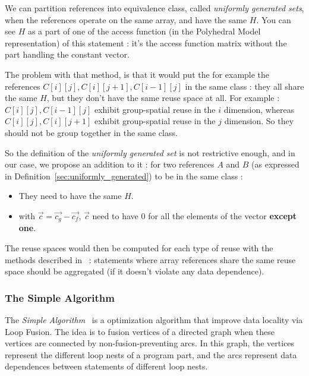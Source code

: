 \documentclass[paper=a4, fontsize=11pt]{scrartcl}
\numberwithin{equation}{section}        %
\numberwithin{figure}{section}          %
\numberwithin{table}{section}               %
\begin{document}
            We can partition references into equivalence class, called \textit{uniformly generated sets},
            when the references operate on the same array, and have the same $H$.
            You can see $H$ as a part of one of the access function (in the Polyhedral Model representation) of this statement :
            it's the access function matrix without the part handling the constant vector.

            The problem with that method, is that it would put the for example the references
            $C[i][j],C[i][j+1],C[i-1][j]$ in the same class : they all share the
            same $H$, but they don't have the same reuse space at all.
            For example : $C[i][j],C[i-1][j]$ exhibit group-spatial reuse in the $i$ dimension,
            whereas $C[i][j],C[i][j+1]$ exhibit group-spatial reuse in the $j$ dimension. So they
            should not be group together in the same class.
            \medskip

            So the definition of the \textit{uniformly generated set} is not restrictive enough,
            and in our case, we propose an addition to it : for two references $A$ and
            $B$ (as expressed in Definition~\ref{sec:uniformly_generated}) to be in the same class :
            \begin{itemize}
                \item They need to have the same $H$.
                \item with $\vec{c}=\vec{c_g} - \vec{c_f}$, $\vec{c}$ need to have $0$
                    for all the elements of the vector \textbf{except one}.
            \end{itemize}

            The reuse spaces would then be computed for each type of reuse
            with the methods described in~\cite{Wolf'91} : statements where
            array references share the same reuse space should be aggregated (if
            it doesn't violate any data dependence).

        \subsubsection{The Simple Algorithm}
            The \textit{Simple Algorithm}~\cite{Kennedy94maximizingloop} is a
            optimization algorithm that improve data locality via Loop Fusion.
            The idea is to fusion vertices of a directed graph when these vertices
            are connected by non-fusion-preventing arcs.
            In this graph, the vertices represent the different loop nests of a program part,
            and the arcs represent data dependences between statements of different loop nests.
\end{document}
